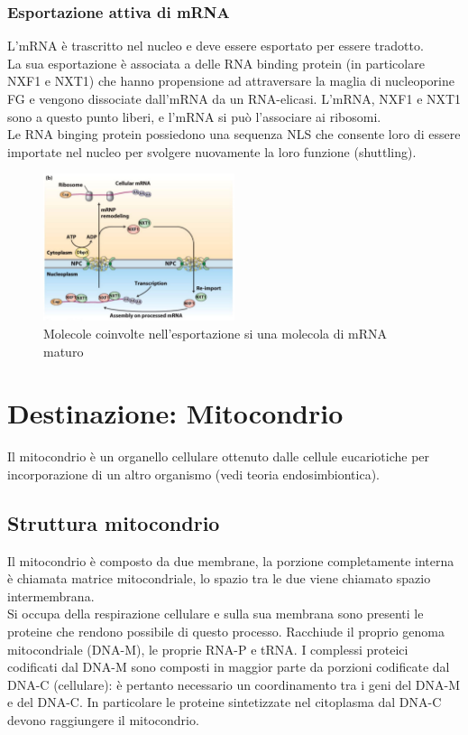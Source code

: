         \subsubsection{Esportazione attiva di mRNA}
            L'mRNA è trascritto nel nucleo e deve essere esportato per essere tradotto.\\
            La sua esportazione è associata a delle RNA binding protein (in particolare NXF1 e NXT1) che hanno propensione ad attraversare la maglia di nucleoporine FG e vengono dissociate dall'mRNA da un RNA-elicasi. 
            L'mRNA, NXF1 e NXT1 sono a questo punto liberi, e l'mRNA si può l'associare ai ribosomi.\\
            Le RNA binging protein possiedono una sequenza NLS che consente loro di essere importate nel nucleo per svolgere nuovamente la loro funzione (shuttling).
            \begin{figure}[h]
                \centering
                \includegraphics[width=0.5\textwidth]{images/exportNucleomRNA.JPG}
                \caption{\small Molecole coinvolte nell'esportazione si una molecola di mRNA maturo}
                \label{fig:mesh1}
            \end{figure}
    
\section{Destinazione: Mitocondrio}
    Il mitocondrio è un organello cellulare ottenuto dalle cellule eucariotiche per incorporazione di un altro organismo (vedi teoria endosimbiontica). 
    \subsection{Struttura mitocondrio}
        Il mitocondrio è composto da due membrane, la porzione completamente interna è chiamata matrice mitocondriale, lo spazio tra le due viene chiamato spazio intermembrana.\\
        Si occupa della respirazione cellulare e sulla sua membrana sono presenti le proteine che rendono possibile di questo processo. Racchiude il proprio genoma mitocondriale (DNA-M), le proprie RNA-P e tRNA. I complessi proteici codificati dal DNA-M sono composti in maggior parte da porzioni codificate dal DNA-C (cellulare): è pertanto necessario un coordinamento tra i geni del DNA-M e del DNA-C.
        In particolare le proteine sintetizzate nel citoplasma dal DNA-C devono raggiungere il mitocondrio.
        
